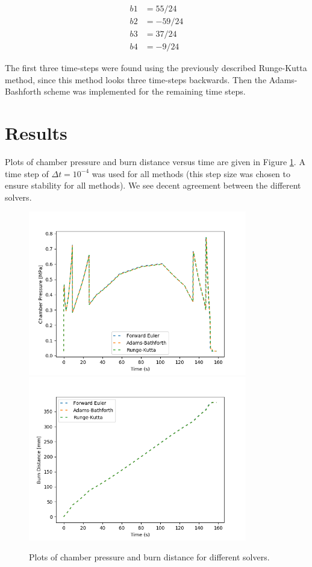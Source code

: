 \documentclass[12pt, letterpaper]{article}
\begin{document}
\begin{align*}
  b1 &= 55/24 \\
  b2 &= -59/24 \\
  b3 &= 37/24 \\
  b4 &= -9/24
\end{align*}

The first three time-steps were found using the previously described Runge-Kutta method, since this method looks three time-steps backwards. Then the Adams-Bashforth scheme was implemented for the remaining time steps. 

\section{Results}

Plots of chamber pressure and burn distance versus time are given in Figure \ref{fig:chamber_pressure_compare}. A time step of $\Delta t = 10^{-4}$ was used for all methods (this step size was chosen to ensure stability for all methods). We see decent agreement between the different solvers. 

\begin{figure}
    \centering
    \includegraphics[width=0.85\textwidth]{chamber_pressure_compare}
    \includegraphics[width=0.85\textwidth]{burn_dist_compare}
    \caption{\label{fig:chamber_pressure_compare} Plots of chamber pressure and burn distance for different solvers.}
\end{figure}
\end{document}
